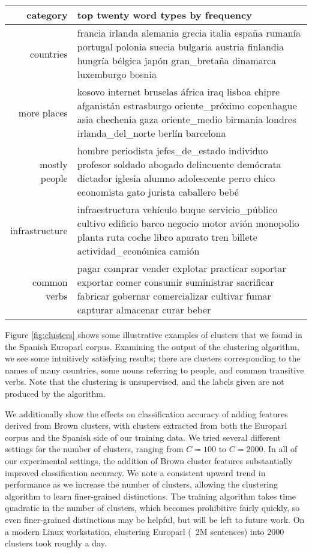 \begin{figure*}[t!]
  \begin{tabular}{|r|p{10cm}|}
    \hline
    category  & top twenty word types by frequency \\
    \hline
    countries & francia irlanda alemania grecia italia españa rumanía portugal polonia suecia bulgaria austria finlandia hungría bélgica japón gran\_bretaña dinamarca luxemburgo bosnia \\
    \hline
    more places & kosovo internet bruselas áfrica iraq lisboa chipre afganistán estrasburgo oriente\_próximo copenhague asia chechenia gaza oriente\_medio birmania londres irlanda\_del\_norte berlín barcelona \\
    \hline
    mostly people & hombre periodista jefes\_de\_estado individuo profesor soldado abogado delincuente demócrata dictador iglesia alumno adolescente perro chico economista gato jurista caballero bebé \\
    \hline
    infrastructure & infraestructura vehículo buque servicio\_público cultivo edificio barco negocio motor avión monopolio planta ruta coche libro aparato tren billete actividad\_económica camión \\
    \hline
    common verbs & pagar comprar vender explotar practicar soportar exportar comer consumir suministrar sacrificar fabricar gobernar comercializar cultivar fumar capturar almacenar curar beber \\
    \hline
  \end{tabular}
\caption{Some illustrative clusters found by the Brown clustering algorithm on
the Spanish Europarl data. These are five out of $C=1000$ clusters, and
were picked and labeled by hand. The words listed are the
top twenty terms from that cluster, by frequency.}
\label{fig:clusters}
\end{figure*}

Figure \ref{fig:clusters} shows some illustrative examples of clusters that
we found in the Spanish Europarl corpus.  Examining the output of the
clustering algorithm, we see some intuitively satisfying results; there are
clusters corresponding to the names of many countries, some nouns referring to
people, and common transitive verbs. Note that the clustering is unsupervised,
and the labels given are not produced by the algorithm.

We additionally show the effects on classification accuracy of adding features
derived from Brown clusters, with clusters extracted from both the Europarl
corpus and the Spanish side of our training data.
We tried several different
settings for the number of clusters, ranging from $C=100$ to $C=2000$.
In all of our experimental settings, the addition of Brown cluster features
substantially improved classification accuracy. We note a consistent upward
trend in performance as we increase the number of clusters, allowing the
clustering algorithm to learn finer-grained distinctions.
The training algorithm takes time quadratic in the number of clusters,
which becomes prohibitive fairly quickly, so even finer-grained distinctions
may be helpful, but will be left to future work. On a modern Linux
workstation, clustering Europarl (~2M sentences) into 2000 clusters took
roughly a day.

